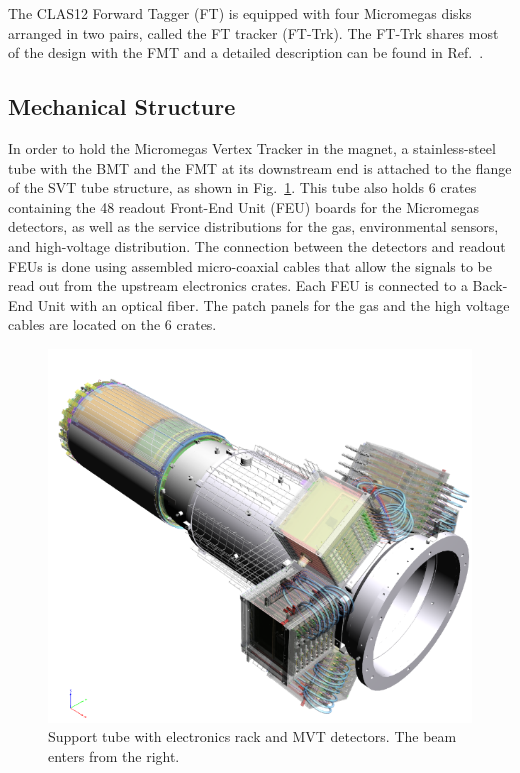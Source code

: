The CLAS12 Forward Tagger (FT) is equipped with four Micromegas disks arranged in two pairs, called the FT
tracker (FT-Trk). The FT-Trk shares most of the design with the FMT and a detailed description can be found in
Ref.~\cite{ft-nim}.

\subsection{Mechanical Structure}

In order to hold the Micromegas Vertex Tracker in the magnet, a stainless-steel tube with the BMT and the FMT at its
downstream end is attached to the flange of the SVT tube structure, as shown in Fig.~\ref{fig:mm-fig2}. This tube also
holds 6 crates containing the 48 readout Front-End Unit (FEU) boards for the Micromegas detectors, as well as the service
distributions for the gas, environmental sensors, and high-voltage distribution. The connection between the detectors and
readout FEUs is done using assembled micro-coaxial cables that allow the signals to be read out from the upstream
electronics crates. Each FEU is connected to a Back-End Unit with an optical fiber. The patch panels for the gas and the high
voltage cables are located on the 6 crates.

\begin{figure}[htb]
 \includegraphics[width=1.0\columnwidth,keepaspectratio]{images/fig2}
 \caption{Support tube with electronics rack and MVT detectors. The beam enters from the right.}
 \label{fig:mm-fig2}
\end{figure}

